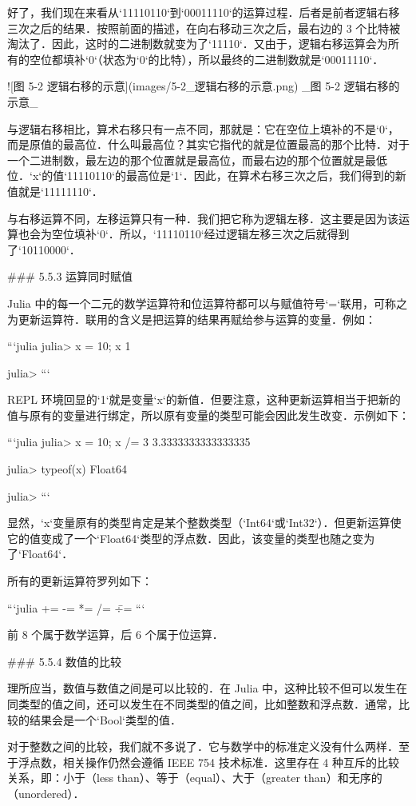 好了，我们现在来看从`11110110`到`00011110`的运算过程．后者是前者逻辑右移三次之后的结果．按照前面的描述，在向右移动三次之后，最右边的 3 个比特被淘汰了．因此，这时的二进制数就变为了`11110`．又由于，逻辑右移运算会为所有的空位都填补`0`（状态为`0`的比特），所以最终的二进制数就是`00011110`．

![图 5-2 逻辑右移的示意](images/5-2_逻辑右移的示意.png)
_图 5-2 逻辑右移的示意_

与逻辑右移相比，算术右移只有一点不同，那就是：它在空位上填补的不是`0`，而是原值的最高位．什么叫最高位？其实它指代的就是位置最高的那个比特．对于一个二进制数，最左边的那个位置就是最高位，而最右边的那个位置就是最低位．`x`的值`11110110`的最高位是`1`．因此，在算术右移三次之后，我们得到的新值就是`11111110`．

与右移运算不同，左移运算只有一种．我们把它称为逻辑左移．这主要是因为该运算也会为空位填补`0`．所以，`11110110`经过逻辑左移三次之后就得到了`10110000`．

### 5.5.3 运算同时赋值

Julia 中的每一个二元的数学运算符和位运算符都可以与赋值符号`=`联用，可称之为更新运算符．联用的含义是把运算的结果再赋给参与运算的变量．例如：

```julia
julia> x = 10; x %
1

julia>
```

REPL 环境回显的`1`就是变量`x`的新值．但要注意，这种更新运算相当于把新的值与原有的变量进行绑定，所以原有变量的类型可能会因此发生改变．示例如下：

```julia
julia> x = 10; x /= 3
3.3333333333333335

julia> typeof(x)
Float64

julia> 
```

显然，`x`变量原有的类型肯定是某个整数类型（`Int64`或`Int32`）．但更新运算使它的值变成了一个`Float64`类型的浮点数．因此，该变量的类型也随之变为了`Float64`．

所有的更新运算符罗列如下：

```julia
+= -= *= /= \= ÷= %
```

前 8 个属于数学运算，后 6 个属于位运算．

### 5.5.4 数值的比较

理所应当，数值与数值之间是可以比较的．在 Julia 中，这种比较不但可以发生在同类型的值之间，还可以发生在不同类型的值之间，比如整数和浮点数．通常，比较的结果会是一个`Bool`类型的值．

对于整数之间的比较，我们就不多说了．它与数学中的标准定义没有什么两样．至于浮点数，相关操作仍然会遵循 IEEE 754 技术标准．这里存在 4 种互斥的比较关系，即：小于（less than）、等于（equal）、大于（greater than）和无序的（unordered）．

